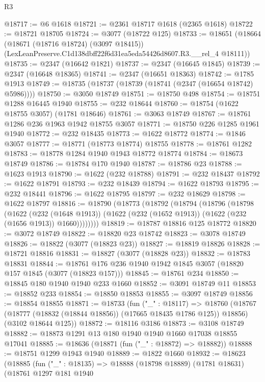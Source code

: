 \begin{lexlean}{R3}
\begin{coremodule}
@18717 := @6 @1618
@18721 := @2361 @18717 @1618 (@2365 @1618)
@18722 := @18721 @18705
@18724 := @3077 (@18722 @125)
@18733 := @18651
    (@18664
      (@18671 (@18716 @18724) (@3097 @18415))
      (LexLeanPreserve.C1d138dbff22f6d31ea5eda54426d8607.R3.__rel_4 @18111))
@18735 := @2347 (@16642 @1821)
@18737 := @2347 (@16645 @1845)
@18739 := @2347 (@16648 @18365)
@18741 := @2347 (@16651 @18363)
@18742 := @1785 @1913
@18749 := @18735 (@18737 (@18739 (@18741 (@2347 (@16654 @18742) @5986))))
@18750 := @3050 @18749
@18751 := @18750 @498
@18754 := @18751 @1288 @16445 @1940
@18755 := @232 @18644
@18760 := @18754 (@1622 @18755 @3057) (@1781 @18646)
@18761 := @3063 @18749
@18767 := @18761 @1286 @236 @1963 @1942 @18755 @3057
@18771 := @18750 @226 @1285 @1961 @1940
@18772 := @232 @18435
@18773 := @1622 @18772
@18774 := @1846 @3057
@18777 := @18771 (@18773 @18774) @18755
@18778 := @18761 @1282
@18783 := @18778 @1284 @1940 @1943 @18772 @18774
@18784 := @18673 @18749
@18786 := @18784 @170 @1940
@18787 := @18786 @23
@18788 := @1623 @1913
@18790 := @1622 (@232 @18788)
@18791 := @232 @18437
@18792 := @1622 @18791
@18793 := @232 @18439
@18794 := @1622 @18793
@18795 := @232 @18441
@18796 := @1622 @18795
@18797 := @232 @18629
@18798 := @1622 @18797
@18816 := @18790
    (@18773
      (@18792
        (@18794
          (@18796
            (@18798
              (@1622
                (@232 (@1648 @1913))
                (@1622 (@232 (@1652 @1913)) (@1622 (@232 (@1656 @1913)) @1660))))))))
@18819 := @18787 @18816 @125 @18772
@18820 := @3072 @18749
@18822 := @18820 @23 @18742
@18823 := @3078 @18749
@18826 := @18822 (@3077 (@18823 @23))
@18827 := @18819 @18826
@18828 := @18721 @18816
@18831 := @18827 (@3077 (@18828 @23))
@18832 := @18783 @18831
@18844 := @18761 @176 @236 @1940 @1942 @1845 @3057 (@18820 @157 @1845 (@3077 (@18823 @157)))
@18845 := @18761 @234
@18850 := @18845 @180 @1940 @1940 @233 @1660
@18852 := @3091 @18749 @11
@18853 := @18852 @233
@18854 := @18850 @18853
@18855 := @3097 @18749
@18856 := @18854 @18855
@18871 := @18733
    (fun ("_" : @18117) =>
    @18760
      (@18767 (@18777 (@18832 (@18844 @18856)) (@17665 @18435 @1786 @125)) @18856)
      (@3102 @18644 @125))
@18872 := @18116 @3186
@18873 := @3108 @18749
@18882 := @18873 @1291 @13 @180 @1940 @1940 @1660 @17038 @18855 @17041
@18885 := @18636 (@18871 (fun ("_" : @18872) => @18882))
@18888 := @18751 @1299 @1943 @1940
@18889 := @1822 @1660
@18932 := @18623
    (@18885
      (fun ("_" : @18135) =>
      @18888
        (@18798 @18889)
        (@1781 @18631)
        (@18761
          @1297
          @181
          @1940

\end{coremodule}
\end{lexlean}
